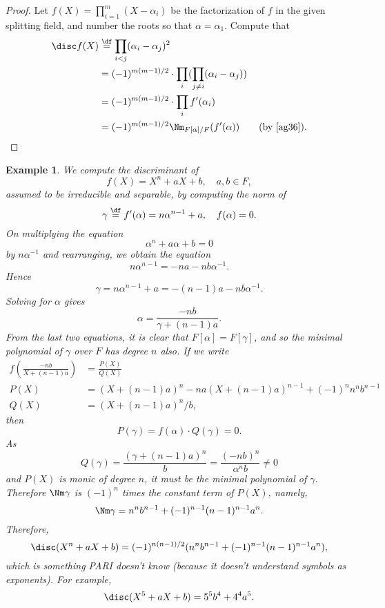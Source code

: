 \documentclass[a4paper,11pt,final,openany]{memoir}
\newtheorem{example}[X]{Example}
\theoremstyle{nonumberplain}
\newtheorem{proof}{Proof.}
\begin{document}
\begin{proof}
Let $f(X)=\prod_{i=1}^{m}(X-\alpha_{i})$ be the factorization of $f$ in the
given splitting field, and number the roots so that $\alpha=\alpha_{1}$.
Compute that
\begin{align*}
\disc f(X)  &  \overset{\df}{=}\prod_{i<j}(\alpha_{i}%
-\alpha_{j})^{2}\\
&  =(-1)^{m(m-1)/2}\cdot\prod_{i}(\prod_{j\neq i}(\alpha_{i}-\alpha_{j}))\\
&  =(-1)^{m(m-1)/2}\cdot\prod_{i}f^{\prime}(\alpha_{i})\\
&  =(-1)^{m(m-1)/2}\Nm_{F[\alpha]/F}(f^{\prime}(\alpha))\qquad\text{(by
\ref{ag36})}.
\end{align*}

\end{proof}

\begin{example}
\label{ag39}We compute the discriminant of
\[
f(X)=X^{n}+aX+b,\quad a,b\in F,
\]
assumed to be irreducible and separable, by computing the norm of
\[
\gamma\overset{\df}{=}f^{\prime}(\alpha)=n\alpha
^{n-1}+a,\quad f(\alpha)=0\text{.}%
\]
On multiplying the equation
\[
\alpha^{n}+a\alpha+b=0
\]
by $n\alpha^{-1}$ and rearranging, we obtain the equation
\[
n\alpha^{n-1}=-na-nb\alpha^{-1}.
\]
Hence
\[
\gamma=n\alpha^{n-1}+a=-(n-1)a-nb\alpha^{-1}.
\]
Solving for $\alpha$ gives
\[
\alpha=\frac{-nb}{\gamma+(n-1)a}.
\]
From the last two equations, it is clear that $F[\alpha]=F[\gamma]$, and so
the minimal polynomial of $\gamma$ over $F$ has degree $n$ also. If we write
\begin{align*}
f\left(  \frac{-nb}{X+(n-1)a}\right)   &  =\frac{P(X)}{Q(X)}\\
P(X)  &  =(X+(n-1)a)^{n}-na(X+(n-1)a)^{n-1}+(-1)^{n}n^{n}b^{n-1}\\
Q(X)  &  =(X+(n-1)a)^{n}/b,
\end{align*}
then
\[
P(\gamma)=f(\alpha)\cdot Q(\gamma)=0.
\]
As%
\[
Q(\gamma)=\frac{(\gamma+(n-1)a)^{n}}{b}=\frac{(-nb)^{n}}{\alpha^{n}b}\neq0
\]
and $P(X)$ is monic of degree $n$, it must be the minimal polynomial of
$\gamma$. Therefore $\Nm\gamma$ is $(-1)^{n}$ times the constant term of
$P(X)$, namely,
\[
\Nm\gamma=n^{n}b^{n-1}+(-1)^{n-1}(n-1)^{n-1}a^{n}.
\]
Therefore,
\[
\disc(X^{n}+aX+b)=(-1)^{n(n-1)/2}(n^{n}b^{n-1}+(-1)^{n-1}(n-1)^{n-1}a^{n}),
\]
which is something PARI%
doesn't know (because it doesn't understand symbols as exponents). For
example,
\[
\disc(X^{5}+aX+b)=5^{5}b^{4}+4^{4}a^{5}.
\]

\end{example}
\end{document}
